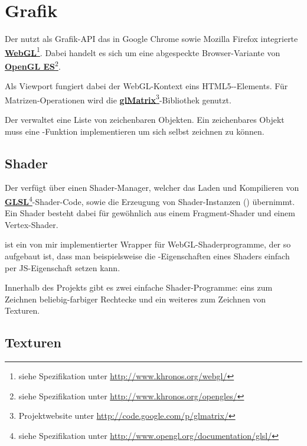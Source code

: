\chapter{Grafik}

Der  nutzt als Grafik-API das in Google Chrome sowie Mozilla Firefox integrierte \textbf{\href{http://www.khronos.org/webgl/}{WebGL}}\footnote{siehe Spezifikation unter \url{http://www.khronos.org/webgl/}}. Dabei handelt es sich um eine abgespeckte Browser-Variante von \textbf{\href{http://www.khronos.org/opengles/}{OpenGL ES}}\footnote{siehe Spezifikation unter \url{http://www.khronos.org/opengles/}}. 

Als Viewport fungiert dabei der WebGL-Kontext eins HTML5--Elements. Für Matrizen-Operationen wird die \textbf{\href{http://code.google.com/p/glmatrix/}{glMatrix}}\footnote{Projektwebsite unter \url{http://code.google.com/p/glmatrix/}}-Bibliothek genutzt.

Der  verwaltet eine Liste von zeichenbaren Objekten. Ein zeichenbares Objekt muss eine -Funktion implementieren um sich selbst zeichnen zu können.

\section{Shader}

Der  verfügt über einen Shader-Manager, welcher das Laden und Kompilieren von \textbf{\href{http://www.opengl.org/documentation/glsl/}{GLSL}}\footnote{siehe Spezifikation unter \url{http://www.opengl.org/documentation/glsl/}}-Shader-Code, sowie die Erzeugung von Shader-Instanzen () übernimmt. Ein Shader besteht dabei für gewöhnlich aus einem Fragment-Shader und einem Vertex-Shader. 

 ist ein von mir implementierter Wrapper für WebGL-Shaderprogramme, der so aufgebaut ist, dass man beispielsweise die -Eigenschaften eines Shaders einfach per JS-Eigenschaft setzen kann.

Innerhalb des Projekts gibt es zwei einfache Shader-Programme: eins zum Zeichnen beliebig-farbiger Rechtecke und ein weiteres zum Zeichnen von Texturen. 

\section{Texturen}

